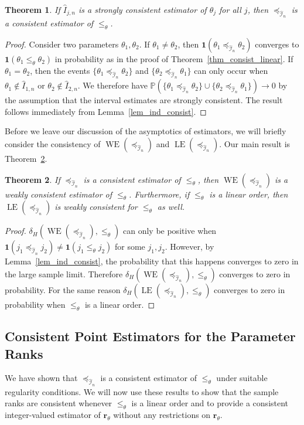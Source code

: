 \documentclass[12pt]{article}
\newcommand{\prob}[1]{\mathbb{P}(#1)}
\newcommand{\ind}[1]{\mathbf{1}(#1)}
\newcommand{\pord}{{\leqslant_{\theta}}}
\newcommand{\iordn}{{\preceq_{\hat{\mathcal{I}}_{n}}}}
\newcommand{\rankp}{{\mathbf{r}_\theta}}
\newcommand{\LE}[1]{\operatorname{LE}(#1)}
\newcommand{\WE}[1]{\operatorname{WE}(#1)}
\newtheorem{theorem}{Theorem}
\numberwithin{theorem}{section}
\begin{document}
\begin{theorem}
\label{thm_consist_weak}
If $\hat{I}_{j, n}$ is a strongly consistent estimator of $\theta_j$ for all $j$, then $\iordn$ is a consistent estimator of $\pord$.
\end{theorem}
\begin{proof}
Consider two parameters $\theta_1, \theta_2$.  If $\theta_1 \neq \theta_2$, then $\ind{\theta_1 \iordn \theta_2}$ converges to $\ind{\theta_1 \pord \theta_2}$ in probability as in the proof of Theorem~\ref{thm_consist_linear}.  If $\theta_1 = \theta_2$, then the events $\{\theta_1 \iordn \theta_2\}$ and $\{\theta_2 \iordn \theta_1\}$ can only occur when $\theta_1 \notin \hat{I}_{1, n}$ or $\theta_2 \notin \hat{I}_{2, n}$.  We therefore have $\prob{\{\theta_1 \iordn \theta_2\} \cup \{\theta_2 \iordn \theta_1\}} \rightarrow 0$ by the assumption that the interval estimates are strongly consistent.  The result follows immediately from Lemma~\ref{lem_ind_consist}.
\end{proof}

Before we leave our discussion of the asymptotics of estimators, we will briefly consider the consistency of $\WE{\iordn}$ and $\LE{\iordn}$.  Our main result is Theorem~\ref{thm_consist_conf_set}.

\begin{theorem}
\label{thm_consist_conf_set}
If $\iordn$ is a consistent estimator of $\pord$, then $\WE{\iordn}$ is a weakly consistent estimator of $\pord$.  Furthermore, if $\pord$ is a linear order, then $\LE{\iordn}$ is weakly consistent for $\pord$ as well.
\end{theorem}
\begin{proof}
$\delta_H(\WE{\iordn}, \pord)$ can only be positive when $\ind{j_1 \iordn j_2} \neq \ind{j_1 \pord j_2}$ for some $j_1, j_2$.  However, by Lemma~\ref{lem_ind_consist}, the probability that this happens converges to zero in the large sample limit.  Therefore $\delta_H(\WE{\iordn}, \pord)$ converges to zero in probability.  For the same reason $\delta_H(\LE{\iordn}, \pord)$ converges to zero in probability when $\pord$ is a linear order.
\end{proof}

\subsection{Consistent Point Estimators for the Parameter Ranks}
\label{subsec_point_est_consist}

We have shown that $\iordn$ is a consistent estimator of $\pord$ under suitable regularity conditions.  We will now use these results to show that the sample ranks are consistent whenever $\pord$ is a linear order and to provide a consistent integer-valued estimator of $\rankp$ without any restrictions on $\rankp$.
\end{document}
